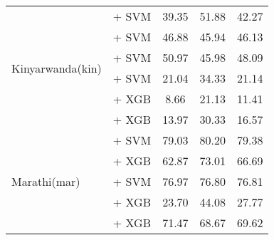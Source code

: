 \begin{longtable}{p{4cm}p{6cm}ccc}
    \midrule
    \multirow{6}{*}{Kinyarwanda(kin)}     & \citep{feng2022languageagnosticbertsentenceembedding} + SVM            & 39.35                                & 51.88              & 42.27             \\
                                          & \citep{adelani2023bertmultilingualkinyarwanda} + SVM                   & 46.88                                & 45.94              & 46.13             \\
                                          & \citep{wang2024multilingual} + SVM                                     & 50.97                                & 45.98              & 48.09             \\
                                          & \citep{adelani2023xlmrobertakinyrwanda} + SVM                          & 21.04                                & 34.33              & 21.14             \\
                                          & \citep{all-MiniLM-L12-v2} + XGB                                        & 8.66                                 & 21.13              & 11.41             \\
                                          & \citep{sturua2024jinaembeddingsv3multilingualembeddingstask} + XGB     & 13.97                                & 30.33              & 16.57             \\

    \midrule
    \multirow{5}{*}{Marathi(mar)}         & \citep{wang2024multilingual} + SVM                                     & 79.03                                & 80.20              & 79.38             \\
                                          & \citep{feng2022languageagnosticbertsentenceembedding} + XGB            & 62.87                                & 73.01              & 66.69             \\
                                          & \citep{feng2022languageagnosticbertsentenceembedding} + SVM            & 76.97                                & 76.80              & 76.81             \\
                                          & \citep{all-MiniLM-L12-v2} + XGB                                        & 23.70                                & 44.08              & 27.77             \\
                                          & \citep{sturua2024jinaembeddingsv3multilingualembeddingstask} + XGB     & 71.47                                & 68.67              & 69.62             \\


\end{longtable}
